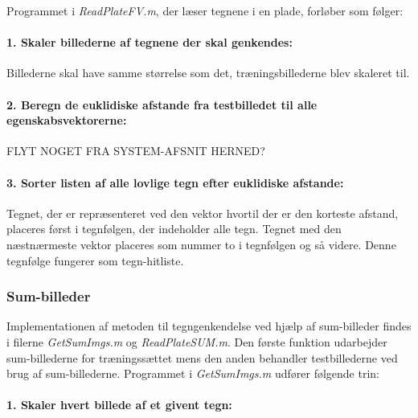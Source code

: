

Programmet i \textit{ReadPlateFV.m}, der læser tegnene i en plade, forløber som følger:

\paragraph{1. Skaler billederne af tegnene der skal genkendes:} Billederne skal have samme størrelse som det, træningsbillederne blev skaleret til.

\paragraph{2. Beregn de euklidiske afstande fra testbilledet til alle egenskabsvektorerne:} FLYT NOGET FRA SYSTEM-AFSNIT HERNED?

\paragraph{3. Sorter listen af alle lovlige tegn efter euklidiske afstande:} Tegnet, der er repræsenteret ved den vektor hvortil der er den korteste afstand, placeres først i tegnfølgen, der indeholder alle tegn. Tegnet med den næstnærmeste vektor placeres som nummer to i tegnfølgen og så videre. Denne tegnfølge fungerer som tegn-hitliste.

\subsubsection{Sum-billeder}

Implementationen af metoden til tegngenkendelse ved hjælp af sum-billeder findes i filerne \textit{GetSumImgs.m} og \textit{ReadPlateSUM.m}. Den første funktion udarbejder sum-billederne for træningssættet mens den anden behandler testbillederne ved brug af sum-billederne. Programmet i \textit{GetSumImgs.m} udfører følgende trin:

\paragraph{1. Skaler hvert billede af et givent tegn:}

